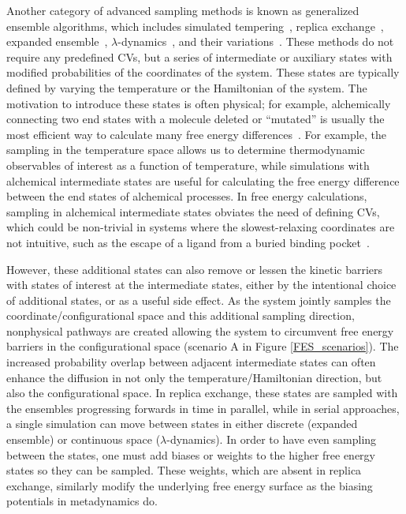 \documentclass[journal=jacsat,manuscript=article]{achemso}
\begin{document}
Another category of advanced sampling methods is known as generalized ensemble algorithms, which includes simulated tempering~\cite{marinari1992simulated}, replica exchange~\cite{TREMD, HREMD}, expanded ensemble~\cite{EXE}, $\lambda$-dynamics~\cite{knight2009lambda}, and their variations~\cite{oshima2019replica, knight2011multisite}. These methods do not require any predefined CVs, but a series of intermediate or auxiliary states with modified probabilities of the coordinates of the system. These states are typically defined by varying the temperature or the Hamiltonian of the system. The motivation to introduce these states is often physical; for example, alchemically connecting two end states with a molecule deleted or ``mutated'' is usually the most efficient way to calculate many free energy differences~\cite{mey2020best}. For example, the sampling in the temperature space allows us to determine thermodynamic observables of interest as a function of temperature, while simulations with alchemical intermediate states are useful for calculating the free energy difference between the end states of alchemical processes. In free energy calculations, sampling in alchemical intermediate states obviates the need of defining CVs, which could be non-trivial in systems where the slowest-relaxing coordinates are not intuitive, such as the escape of a ligand from a buried binding pocket~\cite{buried1, buried2}. 

However, these additional states can also remove or lessen the kinetic barriers with states of interest at the intermediate states, either by the intentional choice of additional states, or as a useful side effect. As the system jointly samples the coordinate/configurational space and this additional sampling direction, nonphysical pathways are created allowing the system to circumvent free energy barriers in the configurational space (scenario A in Figure \ref{FES_scenarios}). The increased probability overlap between adjacent intermediate states can often enhance the diffusion in not only the temperature/Hamiltonian direction, but also the configurational space. In replica exchange, these states are sampled with the ensembles progressing forwards in time in parallel, while in serial approaches, a single simulation can move between states in either discrete (expanded ensemble) or continuous space ($\lambda$-dynamics). In order to have even sampling between the states, one must add biases or weights to the higher free energy states so they can be sampled. These weights, which are absent in replica exchange, similarly modify the underlying free energy surface as the biasing potentials in metadynamics do. 
\end{document}
